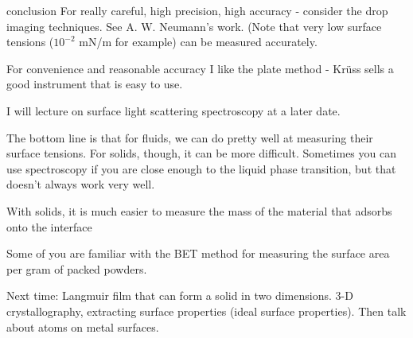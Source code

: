 \documentclass{article}
\begin{document}
\begin{section}{conclusion}
	For really careful, high precision, high accuracy - consider the drop imaging techniques. See A. W. Neumann's work. (Note that very low surface tensions ($10^{-2}$ mN/m for example) can be measured accurately.

	For convenience and reasonable accuracy I like the plate method - Kr\"uss sells a good instrument that is easy to use.

	I will lecture on surface light scattering spectroscopy at a later date.

The bottom line is that for fluids, we can do pretty well at measuring their surface tensions. For solids, though, it can be more difficult. Sometimes you can use spectroscopy if you are close enough to the liquid phase transition, but that doesn't always work very well. 

With solids, it is much easier to measure the mass of the material that adsorbs onto the interface

Some of you are familiar with the BET method for measuring the surface area per gram of packed powders.

Next time: Langmuir film that can form a solid in two dimensions.
3-D crystallography, extracting surface properties (ideal surface properties). Then talk about atoms on metal surfaces.
\end{section}
\end{document}
